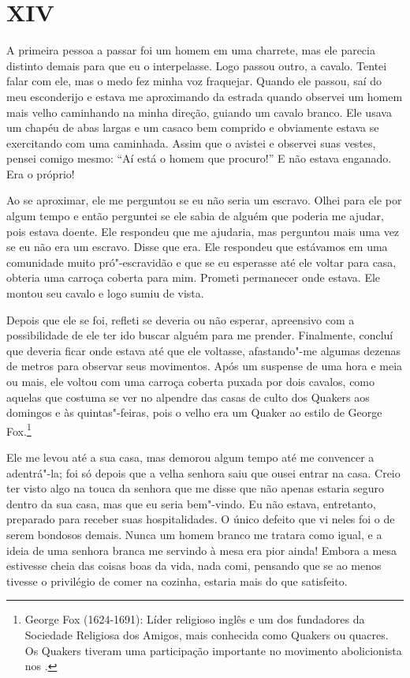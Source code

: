 \chapter{XIV}

A primeira pessoa a passar foi um homem em uma charrete, mas ele parecia
distinto demais para que eu o interpelasse. Logo passou outro, a cavalo.
Tentei falar com ele, mas o medo fez minha voz fraquejar. Quando ele
passou, saí do meu esconderijo e estava me aproximando da estrada quando
observei um homem mais velho caminhando na minha direção, guiando um
cavalo branco. Ele usava um chapéu de abas largas e um casaco bem
comprido e obviamente estava se exercitando com uma caminhada. Assim que
o avistei e observei suas vestes, pensei comigo mesmo: ``Aí está o homem
que procuro!'' E não estava enganado. Era o próprio!

Ao se aproximar, ele me perguntou se eu não seria um escravo. Olhei para
ele por algum tempo e então perguntei se ele sabia de alguém que poderia
me ajudar, pois estava doente. Ele respondeu que me ajudaria, mas
perguntou mais uma vez se eu não era um escravo. Disse que era. Ele
respondeu que estávamos em uma comunidade muito pró"-escravidão e que se
eu esperasse até ele voltar para casa, obteria uma carroça coberta para
mim. Prometi permanecer onde estava. Ele montou seu cavalo e logo sumiu
de vista.

Depois que ele se foi, refleti se deveria ou não esperar, apreensivo com
a possibilidade de ele ter ido buscar alguém para me prender.
Finalmente, concluí que deveria ficar onde estava até que ele voltasse,
afastando"-me algumas dezenas de metros para observar seus movimentos.
Após um suspense de uma hora e meia ou mais, ele voltou com uma carroça
coberta puxada por dois cavalos, como aquelas que costuma se ver no
alpendre das casas de culto dos Quakers aos domingos e às
quintas"-feiras, pois o velho era um Quaker ao estilo de George
Fox.\footnote{George Fox (1624-1691): Líder religioso inglês e um dos
  fundadores da Sociedade Religiosa dos Amigos, mais conhecida como
  Quakers ou quacres. Os Quakers tiveram uma participação importante no
  movimento abolicionista nos .}

Ele me levou até a sua casa, mas demorou algum tempo até me convencer a
adentrá"-la; foi só depois que a velha senhora saiu que ousei entrar na
casa. Creio ter visto algo na touca da senhora que me disse que não
apenas estaria seguro dentro da sua casa, mas que eu seria bem"-vindo. Eu
não estava, entretanto, preparado para receber suas hospitalidades. O
único defeito que vi neles foi o de serem bondosos demais. Nunca um
homem branco me tratara como igual, e a ideia de uma senhora branca me
servindo à mesa era pior ainda! Embora a mesa estivesse cheia das coisas
boas da vida, nada comi, pensando que se ao menos tivesse o privilégio
de comer na cozinha, estaria mais do que satisfeito.

